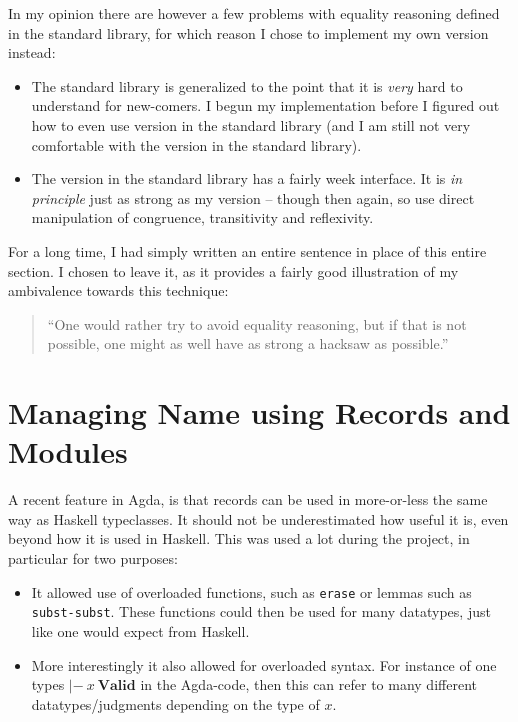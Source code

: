 In my opinion there are however a few problems with equality reasoning defined
in the standard library, for which reason I chose to implement my own version
instead:

\begin{itemize}
\item The standard library is generalized to the point that it is \emph{very}
  hard to understand for new-comers. I begun my implementation before I figured
  out how to even use version in the standard library (and I am still not very
  comfortable with the version in the standard library).
\item The version in the standard library has a fairly week interface. It is
  \emph{in principle} just as strong as my version -- though then again, so use
  direct manipulation of congruence, transitivity and reflexivity.
\end{itemize}

For a long time, I had simply written an entire sentence in place of this entire
section. I chosen to leave it, as it provides a fairly good illustration of my
ambivalence towards this technique:

\begin{quote}
``One would rather try to avoid equality reasoning, but if that is not possible,
one might as well have as strong a hacksaw as possible.''
\end{quote}

\section{Managing Name using Records and Modules}
A recent feature in Agda, is that records can be used in more-or-less the same
way as Haskell typeclasses. It should not be underestimated how useful it is,
even beyond how it is used in Haskell. This was used a lot during the project,
in particular for two purposes:

\begin{itemize}
\item It allowed use of overloaded functions, such as \texttt{erase} or lemmas
  such as \texttt{subst-subst}. These functions could then be used for many
  datatypes, just like one would expect from Haskell.
\item More interestingly it also allowed for overloaded syntax. For instance of
  one types $|-\ x\ \mathbf{Valid}$ in the Agda-code, then this can refer to
  many different datatypes/judgments depending on the type of $x$.
\end{itemize}

